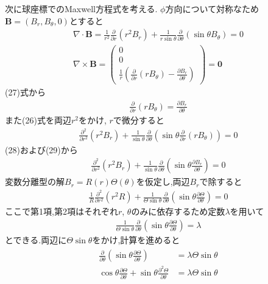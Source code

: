 \documentclass[uplatex,a4j,11pt,dvipdfmx]{jsarticle}
\begin{document}
次に球座標でのMaxwell方程式を考える. $\phi$方向について対称なため${\bm B}=(B_r,B_\theta,0)$とすると
\begin{align}
  \nabla\cdot{\bm B}=\frac{1}{r^2}\frac{\partial}{\partial r}(r^2B_r)+\frac{1}{r\sin\theta}\frac{\partial}{\partial\theta}(\sin\theta B_\theta)=0\\
  \nabla\times{\bm B}=
  \left(
  \begin{matrix}
    0\\0\\
    \frac{1}{r}\left(\frac{\partial}{\partial r}(rB_\theta)-\frac{\partial B_r}{\partial\theta}\right)
  \end{matrix}
  \right)={\bm 0}
\end{align}
(27)式から
\begin{align}
  \frac{\partial}{\partial r}(rB_\theta)=\frac{\partial B_r}{\partial\theta}
\end{align}
また(26)式を両辺$r^2$をかけ, $r$で微分すると
\begin{align}
  \frac{\partial^2}{\partial r^2}(r^2B_r)+\frac{1}{\sin\theta}\frac{\partial}{\partial\theta}(\sin\theta\frac{\partial}{\partial r}(rB_\theta))=0
\end{align}
(28)および(29)から
\begin{align}
  \frac{\partial^2}{\partial r^2}(r^2B_r)+\frac{1}{\sin\theta}\frac{\partial}{\partial\theta}(\sin\theta\frac{\partial B_r}{\partial \theta})=0
\end{align}
変数分離型の解$B_r=R(r)\Theta(\theta)$を仮定し,両辺$B_r$で除すると
\begin{align}
  \frac{1}{R}\frac{\partial^2}{\partial r^2}(r^2R)+\frac{1}{\Theta\sin\theta}\frac{\partial}{\partial\theta}(\sin\theta\frac{\partial\Theta}{\partial\theta})=0
\end{align}
ここで第1項,第2項はそれぞれ$r$, $\theta$のみに依存するため定数$\lambda$を用いて
\begin{align}
  \frac{1}{\Theta\sin\theta}\frac{\partial}{\partial\theta}(\sin\theta\frac{\partial\Theta}{\partial\theta})=\lambda
\end{align}
とできる.両辺に$\Theta\sin\theta$をかけ,計算を進めると
\begin{align}
  \begin{split}
    \frac{\partial}{\partial\theta}(\sin\theta\frac{\partial\Theta}{\partial\theta})&=\lambda\Theta\sin\theta\\
    \cos\theta\frac{\partial\Theta}{\partial\theta}+\sin\theta\frac{\partial^2\Theta}{\partial\theta}&=\lambda\Theta\sin\theta
  \end{split}
\end{align}
\end{document}
